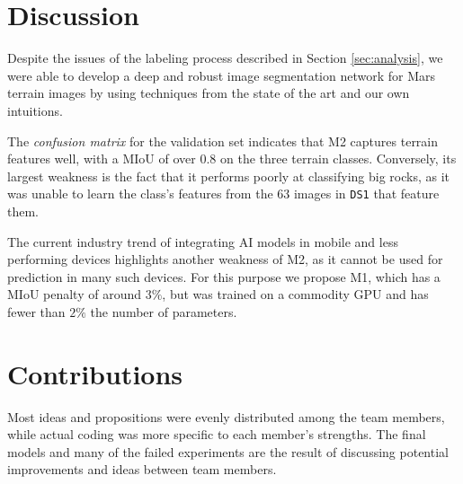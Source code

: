 \documentclass[11pt]{article}
\begin{document}
\begin{multicols}{2}
      \section{Discussion}

      Despite the issues of the labeling process described in Section \ref{sec:analysis}, we were able to develop a deep and robust image segmentation network for Mars terrain images by using techniques from the state of the art and our own intuitions. 
      
      The \textit{confusion matrix} for the validation set indicates that M2 captures terrain features well, with a MIoU of over $0.8$ on the three terrain classes. Conversely, its largest weakness is the fact that it performs poorly at classifying big rocks, as it was unable to learn the class's features from the $63$ images in \texttt{DS1} that feature them. 
      
      The current industry trend of integrating AI models in mobile and less performing devices highlights another weakness of M2, as it cannot be used for prediction in many such devices. For this purpose we propose M1, which has a MIoU penalty of around $3\%$, but was trained on a commodity GPU and has fewer than $2\%$ the number of parameters.

      \section{Contributions}

      Most ideas and propositions were evenly distributed among the team members, while actual coding was more specific to each member's strengths. The final models and many of the failed experiments are the result of discussing potential improvements and ideas between team members.


\end{multicols}
\end{document}
